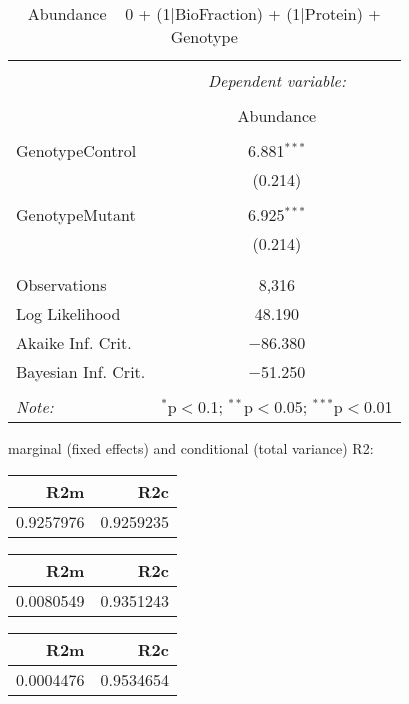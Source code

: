 \documentclass[11pt]{report}
\begin{document}
\begin{table}[!htbp] \centering 
  \caption{Abundance ~ 0 + (1|BioFraction) + (1|Protein) + Genotype} 
  \label{} 
\begin{tabular}{@{\extracolsep{5pt}}lc} 
\\[-1.8ex]\hline 
\hline \\[-1.8ex] 
 & \multicolumn{1}{c}{\textit{Dependent variable:}} \\ 
\cline{2-2} 
\\[-1.8ex] & Abundance \\ 
\hline \\[-1.8ex] 
 GenotypeControl & 6.881$^{***}$ \\ 
  & (0.214) \\ 
  & \\ 
 GenotypeMutant & 6.925$^{***}$ \\ 
  & (0.214) \\ 
  & \\ 
\hline \\[-1.8ex] 
Observations & 8,316 \\ 
Log Likelihood & 48.190 \\ 
Akaike Inf. Crit. & $-$86.380 \\ 
Bayesian Inf. Crit. & $-$51.250 \\ 
\hline 
\hline \\[-1.8ex] 
\textit{Note:}  & \multicolumn{1}{r}{$^{*}$p$<$0.1; $^{**}$p$<$0.05; $^{***}$p$<$0.01} \\ 
\end{tabular} 
\end{table} 
marginal (fixed effects) and conditional (total variance) R2:

\begin{tabular}{r|r}
\hline
R2m & R2c\\
\hline
0.9257976 & 0.9259235\\
\hline
\end{tabular}

\begin{tabular}{r|r}
\hline
R2m & R2c\\
\hline
0.0080549 & 0.9351243\\
\hline
\end{tabular}

\begin{tabular}{r|r}
\hline
R2m & R2c\\
\hline
0.0004476 & 0.9534654\\
\hline
\end{tabular}
\end{document}
